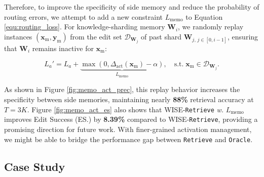 \documentclass{article}
\begin{document}
Therefore, to improve the specificity of side memory and reduce the probability of routing errors, we attempt to add a new constraint $L_{\text{memo}}$ to Equation \ref{equ:routing_loss}.
For knowledge-sharding memory $\mathbf{W}_i$, we randomly replay instances $(\mathbf{x}_{\mathrm{m}}, \mathbf{y}_{\mathrm{m}})$ from the edit set $\mathcal{D}_{\mathbf{W}_j}$ of past shard $\mathbf{W}_{j, \, j \in [0, i-1]}$, ensuring that $\mathbf{W}_i$ remains inactive for $\mathbf{x}_{\mathrm{m}}$:

$$L_a' = L_a + \underbrace{\max(0, \Delta_{\text{act}}(\mathbf{x}_{\mathrm{m}}) - \alpha)}_{L_\text{memo}}, \quad \text{s.t.}\; \mathbf{x}_{\mathrm{m}} \in \mathcal{D}_{\mathbf{W}_j}.$$

As shown in Figure \ref{fig:memo_act_prec}, this replay behavior increases the specificity between side memories, maintaining nearly \textbf{88\%} retrieval accuracy at $T=3K$. 
Figure \ref{fig:memo_act_es} also shows that WISE-\texttt{Retrieve} \textit{w.} $L_{\text{memo}}$ improves Edit Success (ES.) by \textbf{8.39\%} compared to WISE-\texttt{Retrieve}, providing a promising direction for future work.
With finer-grained activation management, we might be able to bridge the performance gap between \texttt{Retrieve} and \texttt{Oracle}.

\subsection{Case Study}

\newcommand{\greenyes}{\textcolor{green}{\ding{51}}}
\newcommand{\bluehalf}{\textcolor{cyan}{\ding{52}\rotatebox[origin=c]{-9.2}{\kern-0.7em\ding{55}}}}
\newcommand{\redno}{\textcolor{red}{\ding{55}}}
\end{document}
